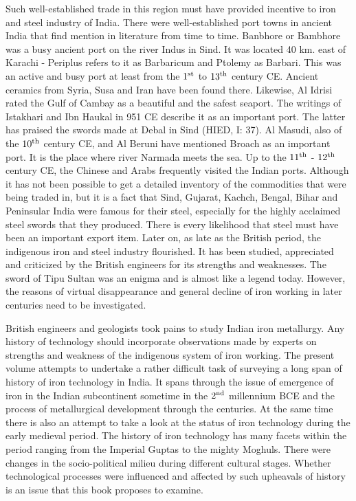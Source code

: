 Such well-established trade in this region must have provided incentive to iron and steel industry of India. There were well-established port towns in ancient India that find mention in literature from time to time. Banbhore or Bambhore was a busy ancient port on the river Indus in Sind. It was located 40 km. east of Karachi - Periplus refers to it as Barbaricum and Ptolemy as Barbari. This was an active and busy port at least from the $1^{\rm st}$ to $13^{\rm th}$ century CE. Ancient ceramics from Syria, Susa and Iran have been found there. Likewise, Al Idrisi rated the Gulf of Cambay as a beautiful and the safest seaport. The writings of Istakhari and Ibn Haukal in 951 CE describe it as an important port. The latter has praised the swords made at Debal in Sind (HIED, I: 37). Al Masudi, also of the $10^{\rm th}$ century CE, and Al Beruni have mentioned Broach as an important port. It is the place where river Narmada meets the sea. Up to the $11^{\rm th}$ - $12^{\rm th}$ century CE, the Chinese and Arabs frequently visited the Indian ports. Although it has not been possible to get a detailed inventory of the commodities that were being traded in, but it is a fact that Sind, Gujarat, Kachch, Bengal, Bihar and Peninsular India were famous for their steel, especially for the highly acclaimed steel swords that they produced. There is every likelihood that steel must have been an important export item. Later on, as late as the British period, the indigenous iron and steel industry flourished. It has been studied, appreciated and criticized by the British engineers for its strengths and weaknesses. The sword of Tipu Sultan was an enigma and is almost like a legend today. However, the reasons of virtual disappearance and general decline of iron working in later centuries need to be investigated. 

British engineers and geologists took pains to study Indian iron metallurgy. Any history of technology should incorporate observations made by experts on strengths and weakness of the indigenous system of iron working. The present volume attempts to undertake a rather difficult task of surveying a long span of history of iron technology in India. It spans through the issue of emergence of iron in the Indian subcontinent sometime in the $2^{\rm nd}$ millennium BCE and the process of metallurgical development through the centuries. At the same time there is also an attempt to take a look at the status of iron technology during the early medieval period. The history of iron technology has many facets within the period ranging from the Imperial Guptas to the mighty Moghuls. There were changes in the socio-political milieu during different cultural stages. Whether technological processes were influenced and affected by such upheavals of history is an issue that this book proposes to examine. 

